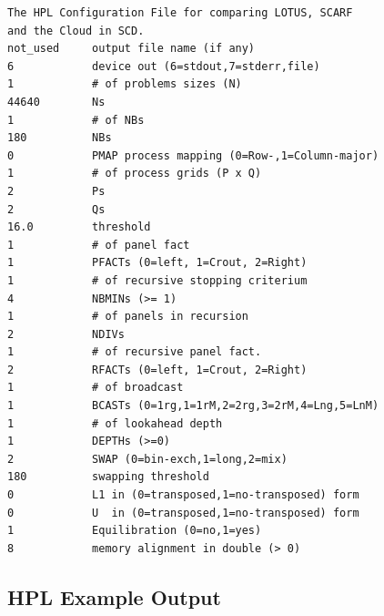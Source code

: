 \documentclass{article}
\begin{document}
        \begin{verbatim}
The HPL Configuration File for comparing LOTUS, SCARF
and the Cloud in SCD.
not_used     output file name (if any)
6            device out (6=stdout,7=stderr,file)
1            # of problems sizes (N)
44640        Ns
1            # of NBs
180          NBs
0            PMAP process mapping (0=Row-,1=Column-major)
1            # of process grids (P x Q)
2            Ps
2            Qs
16.0         threshold
1            # of panel fact
1            PFACTs (0=left, 1=Crout, 2=Right)
1            # of recursive stopping criterium
4            NBMINs (>= 1)
1            # of panels in recursion
2            NDIVs
1            # of recursive panel fact.
2            RFACTs (0=left, 1=Crout, 2=Right)
1            # of broadcast
1            BCASTs (0=1rg,1=1rM,2=2rg,3=2rM,4=Lng,5=LnM)
1            # of lookahead depth
1            DEPTHs (>=0)
2            SWAP (0=bin-exch,1=long,2=mix)
180          swapping threshold
0            L1 in (0=transposed,1=no-transposed) form
0            U  in (0=transposed,1=no-transposed) form
1            Equilibration (0=no,1=yes)
8            memory alignment in double (> 0)
        \end{verbatim}

    \clearpage

    \subsection{HPL Example Output}
        \label{appendix:hpl-example-output}
\end{document}
